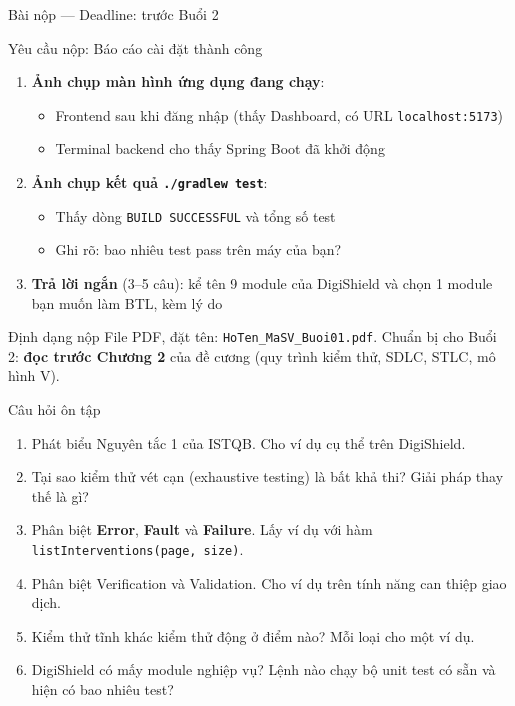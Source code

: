 \documentclass[aspectratio=169,12pt]{beamer}
\begin{document}
\begin{frame}[shrink=8]{Bài nộp --- Deadline: trước Buổi 2}
  \begin{block}{Yêu cầu nộp: Báo cáo cài đặt thành công}
    \begin{enumerate}
      \item \textbf{Ảnh chụp màn hình ứng dụng đang chạy}:
        \begin{itemize}
          \item Frontend sau khi đăng nhập (thấy Dashboard, có URL
                \texttt{localhost:5173})
          \item Terminal backend cho thấy Spring Boot đã khởi động
        \end{itemize}
      \item \textbf{Ảnh chụp kết quả \texttt{./gradlew test}}:
        \begin{itemize}
          \item Thấy dòng \texttt{BUILD SUCCESSFUL} và tổng số test
          \item Ghi rõ: bao nhiêu test pass trên máy của bạn?
        \end{itemize}
      \item \textbf{Trả lời ngắn} (3--5 câu): kể tên 9 module của DigiShield
            và chọn 1 module bạn muốn làm BTL, kèm lý do
    \end{enumerate}
  \end{block}

  \begin{alertblock}{Định dạng nộp}
    File PDF, đặt tên: \texttt{HoTen\_MaSV\_Buoi01.pdf}.
    Chuẩn bị cho Buổi 2: \textbf{đọc trước Chương 2} của đề cương
    (quy trình kiểm thử, SDLC, STLC, mô hình V).
  \end{alertblock}
\end{frame}

\begin{frame}{Câu hỏi ôn tập}
  \begin{enumerate}
    \item Phát biểu Nguyên tắc 1 của ISTQB. Cho ví dụ cụ thể trên DigiShield.
    \item Tại sao kiểm thử vét cạn (exhaustive testing) là bất khả thi?
          Giải pháp thay thế là gì?
    \item Phân biệt \textbf{Error}, \textbf{Fault} và \textbf{Failure}.
          Lấy ví dụ với hàm \texttt{listInterventions(page, size)}.
    \item Phân biệt Verification và Validation. Cho ví dụ trên tính năng
          can thiệp giao dịch.
    \item Kiểm thử tĩnh khác kiểm thử động ở điểm nào? Mỗi loại cho một ví dụ.
    \item DigiShield có mấy module nghiệp vụ? Lệnh nào chạy bộ unit test
          có sẵn và hiện có bao nhiêu test?
  \end{enumerate}
\end{frame}
\end{document}
